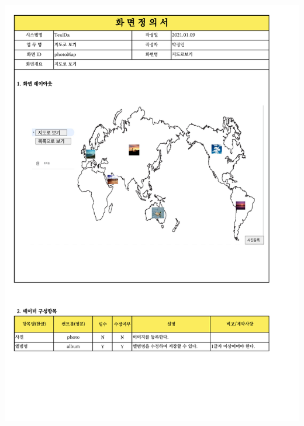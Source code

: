{{{{{{{{{{{{{{{{{{{{{{{{{{{{{{{{{{\includegraphics[width=20cm]{./Figure/Analysis/Display/photo/photo_01.pdf} \\
}}}}}}}}}}}}}}}}}}}}}}}}}}}}}}}}}}
